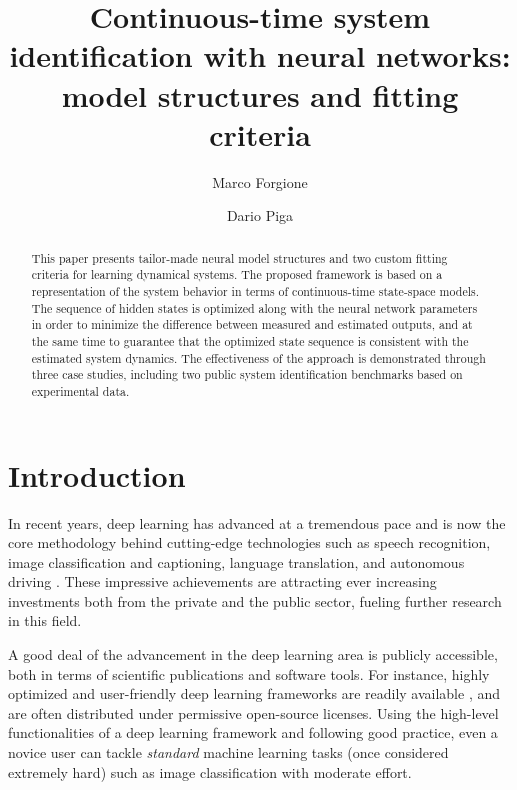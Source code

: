 \documentclass{article} %
\title{Continuous-time system identification with neural networks: model structures and fitting criteria}
\author{Marco Forgione}
\author{Dario Piga}
\affil{IDSIA Dalle Molle Institute for Artificial Intelligence USI-SUPSI, Via la Santa 1, CH-6962 Lugano-Viganello, Switzerland.}
\begin{document}
\maketitle





\begin{abstract}
This paper presents tailor-made neural model structures and two custom fitting criteria for learning dynamical systems. The proposed framework is based
on a representation of the system behavior in terms of continuous-time state-space models. The sequence of hidden states is optimized along with the neural
network parameters in order to minimize the difference between measured and
estimated outputs, and at the same time to guarantee that the optimized state
sequence is consistent with the estimated system dynamics. The effectiveness
of the approach is demonstrated through three case studies, including two public system identification benchmarks based on experimental data.
\end{abstract}


\section{Introduction}
In recent years, deep learning has advanced at a tremendous pace and is now the core methodology behind cutting-edge technologies such as speech recognition, image classification and captioning, language translation, and autonomous driving \citep{schmidhuber2015deep, lecun2015deep, bengio2009learning}. These impressive achievements are attracting ever increasing investments both from the private and the public sector, fueling further research in this field. %

A good deal of the advancement in the deep learning area is publicly accessible, both in terms of scientific publications and software tools.
For instance, highly optimized and user-friendly deep learning frameworks are readily available \citep{paszke:2017automatic, tensorflow2015-whitepaper-short}, and are often distributed under permissive open-source licenses.
Using the high-level functionalities of a deep learning framework and following good practice, even a novice user can tackle  \emph{standard}  machine learning tasks (once considered extremely hard) such as image classification with moderate effort. 
 
\end{document}
